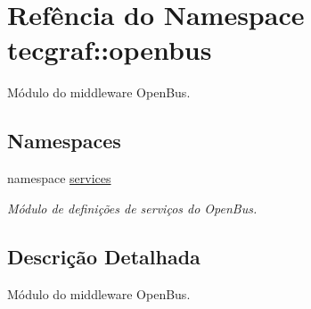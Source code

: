 \hypertarget{namespacetecgraf_1_1openbus}{\section{\-Refência do \-Namespace tecgraf\-:\-:openbus}
\label{namespacetecgraf_1_1openbus}
}


\-Módulo do middleware \-Open\-Bus.  


\subsection*{\-Namespaces}
\begin{DoxyCompactItemize}
\item 
namespace \hyperlink{namespacetecgraf_1_1openbus_1_1services}{services}
\begin{DoxyCompactList}\small\item\em \-Módulo de definições de serviços do \-Open\-Bus. \end{DoxyCompactList}\end{DoxyCompactItemize}


\subsection{\-Descrição \-Detalhada}
\-Módulo do middleware \-Open\-Bus. 